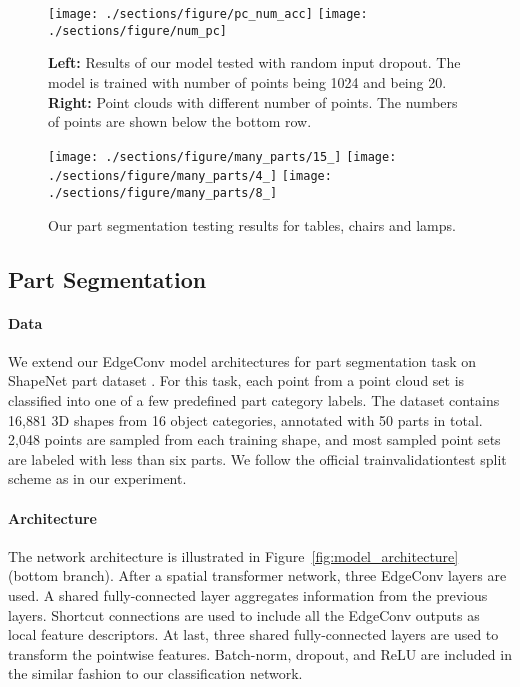 \documentclass[acmtog]{acmart}
\begin{document}
\begin{figure}[t!]
  \centering
  \texttt{[image: ./sections/figure/pc\_num\_acc]}
  \texttt{[image: ./sections/figure/num\_pc]}
  \caption{\textbf{Left:} Results of our model tested with random input dropout. The model is trained with number of points being 1024 and  being 20. \textbf{Right:} Point clouds with different number of points. The numbers of points are shown below the bottom row. }
  \label{fig:num_point_acc}
\end{figure}


\begin{figure}[t!]
  \centering
  \texttt{[image: ./sections/figure/many\_parts/15\_]}\vspace{-.3in}
  \texttt{[image: ./sections/figure/many\_parts/4\_]}\vspace{-.3in}
  \texttt{[image: ./sections/figure/many\_parts/8\_]}\vspace{-.3in}
  \caption{Our part segmentation testing results for tables, chairs and lamps.}
  \label{fig:part_more}
\end{figure}


\subsection{Part Segmentation}
\label{sec:part_seg}
\paragraph{Data} We extend our EdgeConv model architectures for part segmentation task on ShapeNet part dataset \cite{yi2016scalable}.
For this task, each point from a point cloud set is classified into one of a few predefined part category labels.
The dataset contains 16,881 3D shapes from 16 object categories, annotated with 50 parts in total.
2,048 points are sampled from each training shape, and most sampled point sets are labeled with less than six parts. 
We follow the official trainvalidationtest split scheme as \citet{chang2015shapenet} in our experiment. 


\paragraph{Architecture}
The network architecture is illustrated in Figure~\ref{fig:model_architecture} (bottom branch). After a spatial transformer network, three EdgeConv layers are used. A shared fully-connected layer  aggregates information from the previous layers. Shortcut connections are used to include all the EdgeConv outputs as local feature descriptors. At last, three shared fully-connected layers  are used to transform the pointwise features. Batch-norm, dropout, and ReLU are included in the similar fashion to our classification network.
\end{document}
